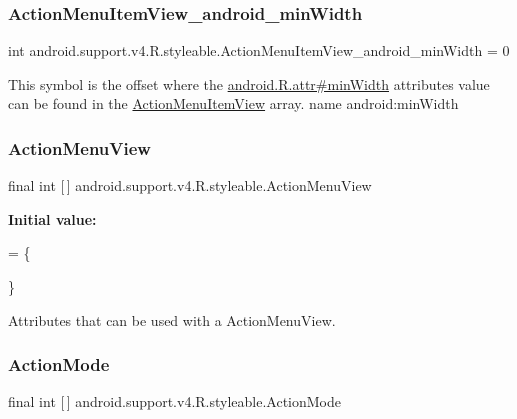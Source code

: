 \subsubsection{\texorpdfstring{Action\+Menu\+Item\+View\+\_\+android\+\_\+min\+Width}{ActionMenuItemView\_android\_minWidth}}
{\footnotesize\ttfamily int android.\+support.\+v4.\+R.\+styleable.\+Action\+Menu\+Item\+View\+\_\+android\+\_\+min\+Width = 0\hspace{0.3cm}{\ttfamily [static]}}

This symbol is the offset where the \hyperlink{}{android.\+R.\+attr\#min\+Width} attribute\textquotesingle{}s value can be found in the \hyperlink{classandroid_1_1support_1_1v4_1_1R_1_1styleable_a061b93f235efedcc9ec8af9ff1428785}{Action\+Menu\+Item\+View} array.  name android\+:min\+Width \mbox{\label{classandroid_1_1support_1_1v4_1_1R_1_1styleable_afa87b5affeb0d4df846452f171c47ce2}} 
\subsubsection{\texorpdfstring{Action\+Menu\+View}{ActionMenuView}}
{\footnotesize\ttfamily final int \mbox{[}$\,$\mbox{]} android.\+support.\+v4.\+R.\+styleable.\+Action\+Menu\+View\hspace{0.3cm}{\ttfamily [static]}}

{\bfseries Initial value\+:}
\begin{DoxyCode}
= \{
            
        \}
\end{DoxyCode}
Attributes that can be used with a Action\+Menu\+View. \mbox{\label{classandroid_1_1support_1_1v4_1_1R_1_1styleable_abc7d063172fa73270c0ab8e5f7093972}} 
\subsubsection{\texorpdfstring{Action\+Mode}{ActionMode}}
{\footnotesize\ttfamily final int \mbox{[}$\,$\mbox{]} android.\+support.\+v4.\+R.\+styleable.\+Action\+Mode\hspace{0.3cm}{\ttfamily [static]}}

